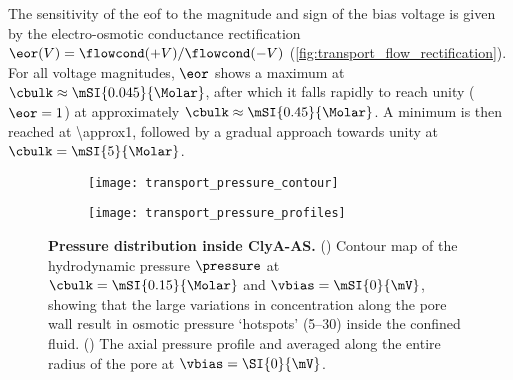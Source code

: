 The sensitivity of the \gls{eof} to the magnitude and sign of the bias voltage is given by the electro-osmotic
conductance rectification $\eor(V) = \flowcond (+V) / \flowcond (-V)$
(\cref{fig:transport_flow_rectification}). For all voltage magnitudes, $\eor$ shows a maximum at $\cbulk
\approx \mSI{0.045}{\Molar}$, after which it falls rapidly to reach unity ($\eor = 1$) at approximately
$\cbulk \approx \mSI{0.45}{\Molar}$. A minimum is then reached at \SI{\approx1}{\Molar}, followed by a gradual
approach towards unity at $\cbulk = \mSI{5}{\Molar}$.

%
\begin{figure*}[t]
  \centering
  
  \begin{subfigure}[t]{6cm}
    \centering
    \caption{}\vspace{-3mm}\label{fig:transport_pressure_contour}
    \texttt{[image: transport\_pressure\_contour]}
  \end{subfigure}
  \hspace{-5mm}
  \begin{subfigure}[t]{4.5cm}
    \centering
    \caption{}\vspace{-3mm}\label{fig:transport_pressure_profiles}
    \texttt{[image: transport\_pressure\_profiles]}
  \end{subfigure}

  \caption[Pressure distribution inside {ClyA-AS}]
  {%
    \textbf{Pressure distribution inside {ClyA-AS}.}
    ()
    Contour map of the hydrodynamic pressure $\pressure$ at $\cbulk = \mSI{0.15}{\Molar}$ and
    $\vbias=\mSI{0}{\mV}$, showing that the large variations in \Na{} concentration along the pore wall result
    in osmotic pressure `hotspots' (\SIrange{5}{30}{\atm}) inside the confined fluid.
    ()
    The axial pressure profile and averaged along the entire radius of the pore at $\vbias=\SI{0}{\mV}$.
  }\label{fig:transport_pressure}

\end{figure*}
%


